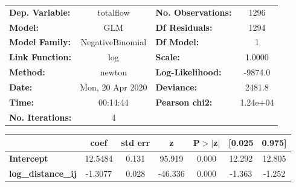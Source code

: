 \begin{center}
\begin{tabular}{lclc}
\toprule
\textbf{Dep. Variable:}    &    totalflow     & \textbf{  No. Observations:  } &     1296    \\
\textbf{Model:}            &       GLM        & \textbf{  Df Residuals:      } &     1294    \\
\textbf{Model Family:}     & NegativeBinomial & \textbf{  Df Model:          } &        1    \\
\textbf{Link Function:}    &       log        & \textbf{  Scale:             } &    1.0000   \\
\textbf{Method:}           &      newton      & \textbf{  Log-Likelihood:    } &   -9874.0   \\
\textbf{Date:}             & Mon, 20 Apr 2020 & \textbf{  Deviance:          } &    2481.8   \\
\textbf{Time:}             &     00:14:44     & \textbf{  Pearson chi2:      } &  1.24e+04   \\
\textbf{No. Iterations:}   &        4         & \textbf{                     } &             \\
\bottomrule
\end{tabular}
\begin{tabular}{lcccccc}
                           & \textbf{coef} & \textbf{std err} & \textbf{z} & \textbf{P$> |$z$|$} & \textbf{[0.025} & \textbf{0.975]}  \\
\midrule
\textbf{Intercept}         &      12.5484  &        0.131     &    95.919  &         0.000        &       12.292    &       12.805     \\
\textbf{log\_distance\_ij} &      -1.3077  &        0.028     &   -46.336  &         0.000        &       -1.363    &       -1.252     \\
\bottomrule
\end{tabular}
\end{center}